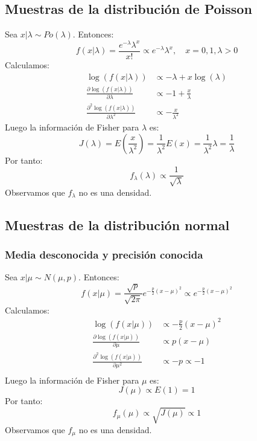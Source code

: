 \subsection*{Muestras de la distribución de Poisson}
Sea $x|\lambda \sim Po(\lambda)$.
Entonces:
$$f(x|\lambda) = \frac{e^{-\lambda}\lambda^x}{x!} \propto e^{-\lambda}\lambda^x, \quad x = 0, 1, \lambda > 0$$
Calculamos:
\begin{align*}
    \log(f(x|\lambda))                                       & \propto -\lambda + x\log(\lambda) \\
    \frac{\partial \log(f(x|\lambda))}{\partial \lambda}     & \propto -1 + \frac{x}{\lambda}    \\
    \frac{\partial^2 \log(f(x|\lambda))}{\partial \lambda^2} & \propto -\frac{x}{\lambda^2}
\end{align*}
Luego la información de Fisher para $\lambda$ es:
$$J(\lambda) = E\left(\frac{x}{\lambda^2}\right) = \frac{1}{\lambda^2}E(x) = \frac{1}{\lambda^2}\lambda = \frac{1}{\lambda}$$
Por tanto:
$$f_\lambda(\lambda) \propto \frac{1}{\sqrt{\lambda}}$$
Observamos que $f_\lambda$ no es una densidad.

\subsection*{Muestras de la distribución normal}
\subsubsection*{Media desconocida y precisión conocida}
Sea $x|\mu \sim N(\mu, p)$.
Entonces:
$$f(x|\mu) = \frac{\sqrt{p}}{\sqrt{2\pi}}e^{-\frac{p}{2}(x-\mu)^2} \propto e^{-\frac{p}{2}(x-\mu)^2}$$
Calculamos:
\begin{align*}
    \log(f(x|\mu))                                   & \propto -\frac{p}{2}(x-\mu)^2 \\
    \frac{\partial \log(f(x|\mu))}{\partial \mu}     & \propto p(x-\mu)              \\
    \frac{\partial^2 \log(f(x|\mu))}{\partial \mu^2} & \propto -p \propto -1         \\
\end{align*}
Luego la información de Fisher para $\mu$ es:
$$J(\mu) \propto E(1) = 1$$
Por tanto:
$$f_\mu(\mu) \propto \sqrt{J(\mu)} \propto 1$$
Observamos que $f_\mu$ no es una densidad.

